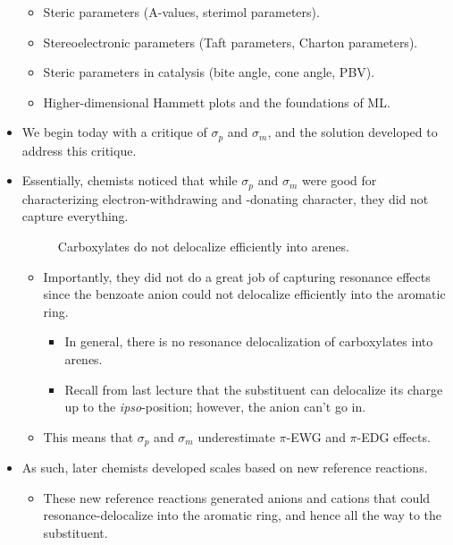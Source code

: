 \documentclass[../notes.tex]{subfiles}
\begin{document}
\begin{itemize}
\begin{itemize}
        \item Steric parameters (A-values, sterimol parameters).
        \item Stereoelectronic parameters (Taft parameters, Charton parameters).
        \item Steric parameters in catalysis (bite angle, cone angle, PBV).
        \item Higher-dimensional Hammett plots and the foundations of ML.
    \end{itemize}
    \item We begin today with a critique of $\sigma_p$ and $\sigma_m$, and the solution developed to address this critique.
    \item Essentially, chemists noticed that while $\sigma_p$ and $\sigma_m$ were good for characterizing electron-withdrawing and -donating character, they did not capture everything.
    \begin{figure}[h!]
        \centering
        \footnotesize
        \caption{Carboxylates do not delocalize efficiently into arenes.}
        \label{fig:carbDelocalArene}
    \end{figure}
    \begin{itemize}
        \item Importantly, they did not do a great job of capturing resonance effects since the benzoate anion could not delocalize efficiently into the aromatic ring.
        \begin{itemize}
            \item In general, there is no resonance delocalization of carboxylates into arenes.
            \item Recall from last lecture that the substituent can delocalize its charge up to the \emph{ipso}-position; however, the anion can't go in.
        \end{itemize}
        \item This means that $\sigma_p$ and $\sigma_m$ underestimate $\pi$-EWG and $\pi$-EDG effects.
    \end{itemize}
    \item As such, later chemists developed scales based on new reference reactions.
    \begin{itemize}
        \item These new reference reactions generated anions and cations that could resonance-delocalize into the aromatic ring, and hence all the way to the substituent.

\end{itemize}
\end{itemize}
\end{document}
